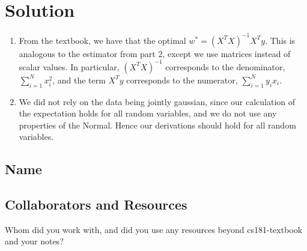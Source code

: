 \documentclass[submit]{harvardml}
\newenvironment{solution}
  {\color{magenta}\section*{Solution}}
{}
\begin{document}
\begin{solution}
\begin{enumerate}
    \item From the textbook, we have that the optimal $w^* = (X^TX)^{-1}X^Ty$. This is analogous to the estimator from part 2, except we use matrices instead of scalar values. In particular, $(X^TX)^{-1}$ corresponds to the denominator, $\sum_{i=1}^Nx_i^2$, and the term $X^Ty$ corresponds to the numerator, $\sum_{i=1}^Ny_ix_i$. 
    
    \item We did not rely on the data being jointly gaussian, since our calculation of the expectation holds for all random variables, and we do not use any properties of the Normal. Hence our derivations should hold for all random variables. 
\end{enumerate}
\end{solution}

\newpage
\subsection*{Name}

\subsection*{Collaborators and Resources}
Whom did you work with, and did you use any resources beyond cs181-textbook and your notes?
\end{document}
